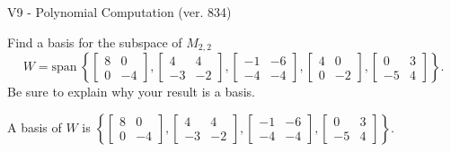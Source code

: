 \begin{exercise}
  \begin{exerciseTitle}V9 - Polynomial Computation (ver. 834)\end{exerciseTitle}
  \begin{exerciseStatement}
    Find a basis for the subspace of \(M_{2,2}\) 
\[W=\mathrm{span}\ \left\{\left[\begin{array}{cc}
8 & 0 \\
0 & -4
\end{array}\right] , \left[\begin{array}{cc}
4 & 4 \\
-3 & -2
\end{array}\right] , \left[\begin{array}{cc}
-1 & -6 \\
-4 & -4
\end{array}\right] , \left[\begin{array}{cc}
4 & 0 \\
0 & -2
\end{array}\right] , \left[\begin{array}{cc}
0 & 3 \\
-5 & 4
\end{array}\right]\right\}.\]
 Be sure to explain why your result is a basis.


  \end{exerciseStatement}
  \begin{exerciseAnswer}
   A basis of \(W\) is  \(\left\{\left[\begin{array}{cc}
8 & 0 \\
0 & -4
\end{array}\right] , \left[\begin{array}{cc}
4 & 4 \\
-3 & -2
\end{array}\right] , \left[\begin{array}{cc}
-1 & -6 \\
-4 & -4
\end{array}\right] , \left[\begin{array}{cc}
0 & 3 \\
-5 & 4
\end{array}\right]\right\}\).
  


  \end{exerciseAnswer}
\end{exercise}